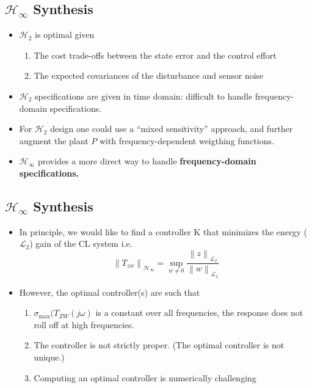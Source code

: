 \subsection{\texorpdfstring{$\mathcal{H}_\infty$}{H-infinity} Synthesis}
\begin{itemize}
    \item $\mathcal{H}_2$ is optimal given
          \begin{enumerate}
              \item The cost trade-offs between the state error and the control effort
              \item The expected covariances of the disturbance and sensor noise
          \end{enumerate}
    \item $\mathcal{H}_2$ specifications are given in time domain: difficult to handle frequency-domain specifications.
    \item For $\mathcal{H}_2$ design one could use a “mixed sensitivity” approach, and further augment the plant $P$ with frequency-dependent weigthing functions.
    \item $\mathcal{H}_\infty$ provides a more direct way to handle \textbf{frequency-domain specifications.}
\end{itemize}


\subsection{\texorpdfstring{$\mathcal{H}_\infty$}{H-infinity} Synthesis}
\begin{itemize}
    \item In principle, we would like to find a controller K that minimizes the energy ($\mathcal{L}_2$) gain of the CL system i.e.
          \begin{equation*}
              \left\|T_{zw}\right\|_{\mathcal{H}_\infty}=\sup_{w\neq0}\frac{\left\|z\right\|_{\mathcal{L}_2}}{\left\|w\right\|_{\mathcal{L}_2}}
          \end{equation*}
    \item However, the optimal controller(s) are such that
          \begin{enumerate}
              \item $\sigma_{\max}(T_{ZW}(j\omega)$ is a constant over all frequencies, the response does not roll off at high frequencies.
              \item The controller is not strictly proper. (The optimal controller is not unique.)
              \item Computing an optimal controller is numerically challenging
          \end{enumerate}
\end{itemize}

